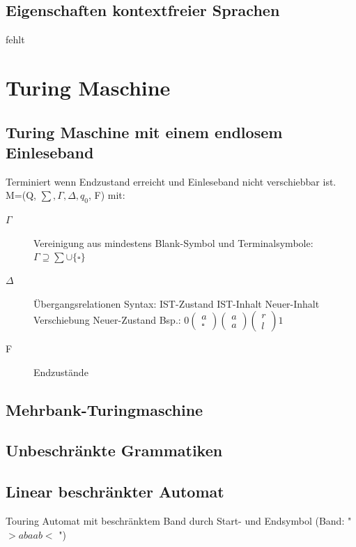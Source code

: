 \documentclass[12pt,a4paper]{article}
\begin{document}
	\subsection{Eigenschaften kontextfreier Sprachen}
	fehlt


\section{Turing Maschine}
	\subsection{Turing Maschine mit einem endlosem Einleseband}
	Terminiert wenn Endzustand erreicht und Einleseband nicht verschiebbar ist.\\
	M=(Q, $\sum, \Gamma , \Delta , q_0$, F) mit:\\
	\begin{description}
		\item[$\Gamma$] Vereinigung aus mindestens Blank-Symbol und Terminalsymbole: $\Gamma \supseteq \sum \cup \{ \square \} $
		\item[$\Delta$] Übergangsrelationen Syntax: IST-Zustand IST-Inhalt Neuer-Inhalt Verschiebung Neuer-Zustand Bsp.: $0 \left( \begin{array}{c} a \\ \square \end{array}\right) \left( \begin{array}{c} a \\ a \end{array}\right) \left( \begin{array}{c} r \\ l \end{array} \right) 1$
		\item[F] Endzustände
	\end{description}

	\subsection{Mehrbank-Turingmaschine}

	\subsection{Unbeschränkte Grammatiken}

	\subsection{Linear beschränkter Automat}
		Touring Automat mit beschränktem Band durch Start- und Endsymbol (Band: " $>abaab<$ ")
\end{document}
